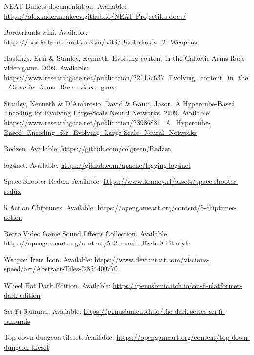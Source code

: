 \begin{thebibliography}{1}
     NEAT Bullets documentation. Available: \url{https://alexandermenkeev.github.io/NEAT-Projectiles-docs/}

     Borderlands wiki. Available: \url{https://borderlands.fandom.com/wiki/Borderlands_2_Weapons}

     Hastings, Erin \& Stanley, Kenneth. \flqq Evolving content in the Galactic Arms Race video game\frqq. 2009. Available: \url{https://www.researchgate.net/publication/221157637_Evolving_content_in_the_Galactic_Arms_Race_video_game}

     Stanley, Kenneth \& D'Ambrosio, David \& Gauci, Jason. \flqq A Hypercube-Based Encoding for Evolving Large-Scale Neural Networks\frqq. 2009. Available: \url{https://www.researchgate.net/publication/23986881_A_Hypercube-Based_Encoding_for_Evolving_Large-Scale_Neural_Networks}

     Redzen. Available: \url{https://github.com/colgreen/Redzen}

     log4net. Available: \url{https://github.com/apache/logging-log4net}

     Space Shooter Redux. Available: \url{https://www.kenney.nl/assets/space-shooter-redux}

     5 Action Chiptunes. Available: \url{https://opengameart.org/content/5-chiptunes-action}

     Retro Video Game Sound Effects Collection. Available: \url{https://opengameart.org/content/512-sound-effects-8-bit-style}

     Weapon Item Icon. Available: \url{https://www.deviantart.com/viscious-speed/art/Abstract-Tiles-2-854400770}

     Wheel Bot Dark Edition. Available: \url{https://penusbmic.itch.io/sci-fi-platformer-dark-edition}

     Sci-Fi Samurai. Available: \url{https://penusbmic.itch.io/the-dark-series-sci-fi-samurais}

     Top down dungeon tileset. Available: \url{https://opengameart.org/content/top-down-dungeon-tileset}

\end{thebibliography}